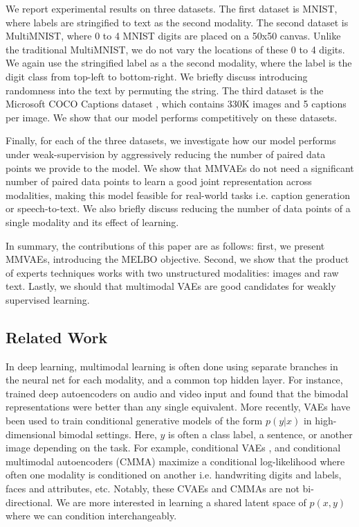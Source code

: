 \documentclass{article}
\begin{document}
We report experimental results on three datasets. The first dataset is MNIST, where labels are stringified to text as the second modality. The second dataset is MultiMNIST, where 0 to 4 MNIST digits are placed on a 50x50 canvas. Unlike the traditional MultiMNIST, we do not vary the locations of these 0 to 4 digits. We again use the stringified label as a the second modality, where the label is the digit class from top-left to bottom-right. We briefly discuss introducing randomness into the text by permuting the string. The third dataset is the Microsoft COCO Captions dataset \cite{chen2015microsoft}, which contains 330K images and 5 captions per image. We show that our model performs competitively on these datasets.

Finally, for each of the three datasets, we investigate how our model performs under weak-supervision by aggressively reducing the number of paired data points we provide to the model. We show that MMVAEs do not need a significant number of paired data points to learn a good joint representation across modalities, making this model feasible for real-world tasks i.e. caption generation or speech-to-text. We also briefly discuss reducing the number of data points of a single modality and its effect of learning.

In summary, the contributions of this paper are as follows: first, we present MMVAEs, introducing the MELBO objective. Second, we show that the product of experts techniques works with two unstructured modalities: images and raw text. Lastly, we should that multimodal VAEs are good candidates for weakly supervised learning.

\subsection{Related Work}
In deep learning, multimodal learning is often done using separate branches in the neural net for each modality, and a common top hidden layer. For instance, \citet{ngiam2011multimodal} trained deep autoencoders on audio and video input and found that the bimodal representations were better than any single equivalent. More recently, VAEs \cite{kingma2013auto, kingma2014semi} have been used to train conditional generative models of the form $p(y | x)$ in high-dimensional bimodal settings. Here, $y$ is often a class label, a sentence, or another image depending on the task. For example, conditional VAEs \cite{sohn2015learning}, and conditional multimodal autoencoders (CMMA) \cite{pandey2017variational} maximize a conditional log-likelihood where often one modality is conditioned on another i.e. handwriting digits and labels, faces and attributes, etc. Notably, these CVAEs and CMMAs are not bi-directional. We are more interested in learning a shared latent space of $p(x, y)$ where we can condition interchangeably. 
\end{document}
